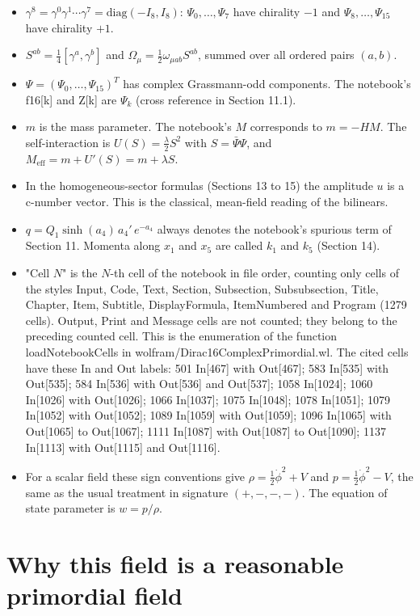 \documentclass[11pt]{article}
\begin{document}
\begin{itemize}
\item $\gamma^8=\gamma^0\gamma^1\cdots\gamma^7=\mathrm{diag}(-I_8,I_8)$: $\Psi_0,\dots,\Psi_7$ have chirality $-1$ and $\Psi_8,\dots,\Psi_{15}$ have chirality $+1$.
\item $S^{ab}=\tfrac14[\gamma^a,\gamma^b]$ and $\Omega_\mu=\tfrac12\omega_{\mu ab}S^{ab}$, summed over all ordered pairs $(a,b)$.
\item $\Psi=(\Psi_0,\dots,\Psi_{15})^T$ has complex Grassmann-odd components. The notebook's f16[k] and Z[k] are $\Psi_k$ (cross reference in Section 11.1).
\item $m$ is the mass parameter. The notebook's $M$ corresponds to $m=-HM$. The self-interaction is $U(S)=\tfrac\lambda2S^2$ with $S=\bar\Psi\Psi$, and $M_{\mathrm{eff}}=m+U'(S)=m+\lambda S$.
\item In the homogeneous-sector formulas (Sections 13 to 15) the amplitude $u$ is a c-number vector. This is the classical, mean-field reading of the bilinears.
\item $q=Q_1\sinh(a_4)\,a_4'\,e^{-a_4}$ always denotes the notebook's spurious term of Section 11. Momenta along $x_1$ and $x_5$ are called $k_1$ and $k_5$ (Section 14).
\item "Cell $N$" is the $N$-th cell of the notebook in file order, counting only cells of the styles Input, Code, Text, Section, Subsection, Subsubsection, Title, Chapter, Item, Subtitle, DisplayFormula, ItemNumbered and Program (1279 cells). Output, Print and Message cells are not counted; they belong to the preceding counted cell. This is the enumeration of the function loadNotebookCells in wolfram/Dirac16ComplexPrimordial.wl. The cited cells have these In and Out labels: 501 In[467] with Out[467]; 583 In[535] with Out[535]; 584 In[536] with Out[536] and Out[537]; 1058 In[1024]; 1060 In[1026] with Out[1026]; 1066 In[1037]; 1075 In[1048]; 1078 In[1051]; 1079 In[1052] with Out[1052]; 1089 In[1059] with Out[1059]; 1096 In[1065] with Out[1065] to Out[1067]; 1111 In[1087] with Out[1087] to Out[1090]; 1137 In[1113] with Out[1115] and Out[1116].
\item For a scalar field these sign conventions give $\rho=\tfrac12\dot\phi^2+V$ and $p=\tfrac12\dot\phi^2-V$, the same as the usual treatment in signature $(+,-,-,-)$. The equation of state parameter is $w=p/\rho$.
\end{itemize}

\section{Why this field is a reasonable primordial field}
\end{document}
